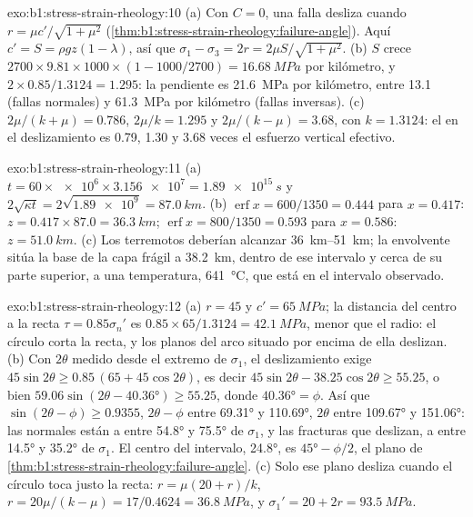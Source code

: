 \begin{solution}{exo:b1:stress-strain-rheology:10}
(a) Con $C = 0$, una falla desliza cuando $r = \mu c'/\sqrt{1+\mu^2}$
(\cref{thm:b1:stress-strain-rheology:failure-angle}). Aquí $c' = S =
\rho g z(1-\lambda)$, así que $\sigma_1 - \sigma_3 = 2r = 2\mu S/\sqrt{1+\mu^2}$.
(b) $S$ crece $2700\times9.81\times1000\times(1 - 1000/2700) =
\qty{16.68}{MPa}$ por kilómetro, y $2\times0.85/1.3124 = 1.295$: la pendiente es
\qty{21.6}{MPa} por kilómetro, entre \num{13.1} (fallas normales) y
\qty{61.3}{MPa} por kilómetro (fallas inversas). (c) $2\mu/(k+\mu) = 0.786$,
$2\mu/k = 1.295$ y $2\mu/(k-\mu) = 3.68$, con $k = 1.3124$: el  en el deslizamiento es 0.79, 1.30 y 3.68 veces el esfuerzo
vertical efectivo.
\end{solution}

\begin{solution}{exo:b1:stress-strain-rheology:11}
(a) $t = 60\times\num{e6}\times\num{3.156e7} = \qty{1.89e15}{s}$ y
$2\sqrt{\kappa t} = 2\sqrt{\num{1.89e9}} = \qty{87.0}{km}$. (b)
$\operatorname{erf}x = 600/1350 = 0.444$ para $x = 0.417$: $z = 0.417\times87.0
= \qty{36.3}{km}$; $\operatorname{erf}x = 800/1350 = 0.593$ para $x = 0.586$:
$z = \qty{51.0}{km}$. (c) Los terremotos deberían alcanzar \qtyrange{36}{51}{km};
la envolvente sitúa la base de la capa frágil a \qty{38.2}{km}, dentro de ese
intervalo y cerca de su parte superior, a una temperatura, \qty{641}{\degreeCelsius}, que
está en el intervalo observado.
\end{solution}

\begin{solution}{exo:b1:stress-strain-rheology:12}
(a) $r = 45$ y $c' = \qty{65}{MPa}$; la distancia del centro a la recta
$\tau = 0.85\sigma_n'$ es $0.85\times65/1.3124 = \qty{42.1}{MPa}$, menor que
el radio: el círculo corta la recta, y los planos del arco situado por encima
de ella deslizan. (b) Con $2\theta$ medido desde el extremo de $\sigma_1$, el
deslizamiento exige $45\sin2\theta \ge 0.85\,(65 + 45\cos2\theta)$, es decir
$45\sin2\theta - 38.25\cos2\theta \ge 55.25$, o bien
$59.06\sin(2\theta - \ang{40.36}) \ge 55.25$, donde $\ang{40.36} = \phi$.
Así que $\sin(2\theta - \phi) \ge 0.9355$, $2\theta - \phi$ entre \ang{69.31}
y \ang{110.69}, $2\theta$ entre \ang{109.67} y \ang{151.06}: las normales
están a entre \ang{54.8} y \ang{75.5} de $\sigma_1$, y las fracturas que
deslizan, a entre \ang{14.5} y \ang{35.2} de $\sigma_1$. El centro del intervalo,
\ang{24.8}, es $\ang{45} - \phi/2$, el plano de
\cref{thm:b1:stress-strain-rheology:failure-angle}. (c) Solo ese plano desliza
cuando el círculo toca justo la recta: $r = \mu(20 + r)/k$, $r = 20\mu/(k -
\mu) = 17/0.4624 = \qty{36.8}{MPa}$, y $\sigma_1' = 20 + 2r =
\qty{93.5}{MPa}$.
\end{solution}

